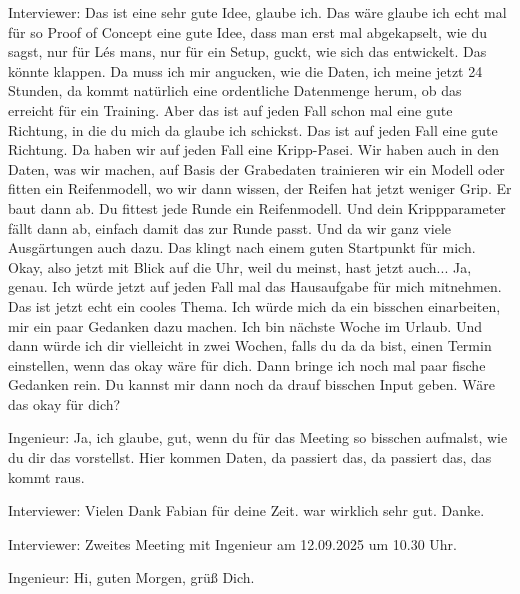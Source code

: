 Interviewer:
Das ist eine sehr gute Idee, glaube ich. Das wäre glaube ich echt mal für so Proof of Concept eine gute Idee, dass man erst mal abgekapselt, wie du sagst, nur für Lés mans, nur für ein Setup, guckt, wie sich das entwickelt. Das könnte klappen. Da muss ich mir angucken, wie die Daten, ich meine jetzt 24 Stunden, da kommt natürlich eine ordentliche Datenmenge herum, ob das erreicht für ein Training. Aber das ist auf jeden Fall schon mal eine gute Richtung, in die du mich da glaube ich schickst. Das ist auf jeden Fall eine gute Richtung. Da haben wir auf jeden Fall eine Kripp-Pasei. Wir haben auch in den Daten, was wir machen, auf Basis der Grabedaten trainieren wir ein Modell oder fitten ein Reifenmodell, wo wir dann wissen, der Reifen hat jetzt weniger Grip. Er baut dann ab. Du fittest jede Runde ein Reifenmodell. Und dein Krippparameter fällt dann ab, einfach damit das zur Runde passt. Und da wir ganz viele Ausgärtungen auch dazu.  Das klingt nach  einem guten  Startpunkt für mich. Okay, also jetzt mit Blick auf die Uhr, weil du meinst, hast jetzt auch... Ja, genau. Ich würde jetzt auf jeden Fall mal das Hausaufgabe für mich mitnehmen. Das ist jetzt echt ein cooles Thema. Ich würde mich da ein bisschen einarbeiten, mir ein paar Gedanken dazu machen. Ich bin nächste Woche im Urlaub. Und dann würde ich dir vielleicht in zwei Wochen, falls du da da bist, einen Termin einstellen, wenn das okay wäre für dich.  Dann bringe ich noch mal paar fische Gedanken rein. Du kannst mir dann noch da drauf bisschen Input geben. Wäre das okay für dich? 

Ingenieur:
Ja, ich glaube, gut, wenn du für das Meeting so bisschen aufmalst, wie du dir das vorstellst. Hier kommen Daten, da passiert das, da passiert das, das kommt raus. 

Interviewer:
Vielen Dank Fabian für deine Zeit. war wirklich sehr gut. Danke.

\label{transkript-meeting2}


Interviewer:
Zweites Meeting mit Ingenieur am 12.09.2025 um  10.30 Uhr.

Ingenieur:
Hi, guten Morgen, grüß Dich. 

